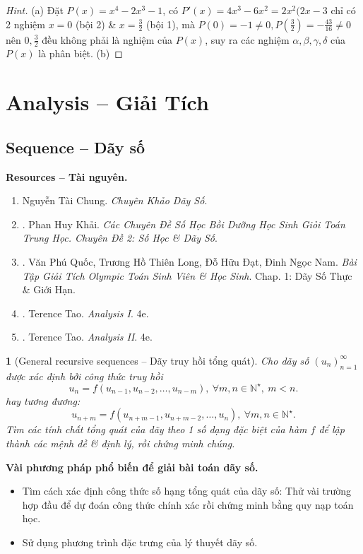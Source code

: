 \documentclass{article}
\newtheorem{baitoan}{}
\begin{document}
\begin{proof}[Hint]
	(a) Đặt $P(x) = x^4 - 2x^3 - 1$, có $P'(x) = 4x^3 - 6x^2 = 2x^2(2x - 3$ chỉ có 2 nghiệm $x = 0$ (bội 2) \& $x = \frac{3}{2}$ (bội 1), mà $P(0) = -1\ne0,P(\frac{3}{2}) = -\frac{43}{16}\ne0$ nên $0,\frac{3}{2}$ đều không phải là nghiệm của $P(x)$, suy ra các nghiệm $\alpha,\beta,\gamma,\delta$ của $P(x)$ là phân biệt. (b) 
\end{proof}


\section{Analysis -- Giải Tích}

\subsection{Sequence -- Dãy số}
\textbf{\textsf{Resources -- Tài nguyên.}}
\begin{enumerate}
	\item {\sc Nguyễn Tài Chung}. {\it Chuyên Khảo Dãy Số}.
	\item \cite{Khai_so_hoc_day_so}. {\sc Phan Huy Khải}. {\it Các Chuyên Đề Số Học Bồi Dưỡng Học Sinh Giỏi Toán Trung Học. Chuyên Đề 2: Số Học \& Dãy Số}.
	\item \cite{Quoc_Long_Dat_Nam_VMC}. {\sc Văn Phú Quốc, Trương Hồ Thiên Long, Đỗ Hữu Đạt, Đinh Ngọc Nam}. {\it Bài Tập Giải Tích Olympic Toán Sinh Viên \& Học Sinh}. Chap. 1: Dãy Số Thực \& Giới Hạn.
	\item \cite{Tao_analysis_1}. {\sc Terence Tao}. {\it Analysis I}. 4e.
	\item \cite{Tao_analysis_2}. {\sc Terence Tao}. {\it Analysis II}. 4e.
\end{enumerate}

\begin{baitoan}[General recursive sequences -- Dãy truy hồi tổng quát]
	Cho dãy số $(u_n)_{n=1}^\infty$ được xác định bởi công thức truy hồi
	\begin{equation}
		\boxed{u_n = f(u_{n-1},u_{n-2},\ldots,u_{n-m}),\ \forall m,n\in\mathbb{N}^\star,\ m < n.}
	\end{equation}
	hay tương đương:
	\begin{equation*}
		\boxed{u_{n + m} = f(u_{n + m - 1},u_{n+m-2},\ldots,u_n),\ \forall m,n\in\mathbb{N}^\star.}
	\end{equation*}
	Tìm các tính chất tổng quát của dãy theo 1 số dạng đặc biệt của hàm $f$ để lập thành các mệnh đề \& định lý, rồi chứng minh chúng.
\end{baitoan}
\textbf{\textsf{Vài phương pháp phổ biến để giải bài toán dãy số.}}
\begin{itemize}
	\item Tìm cách xác định công thức số hạng tổng quát của dãy số: Thử vài trường hợp đầu để dự đoán công thức chính xác rồi chứng minh bằng quy nạp toán học.
	\item Sử dụng phương trình đặc trưng của lý thuyết dãy số.
\end{itemize}
\end{document}
